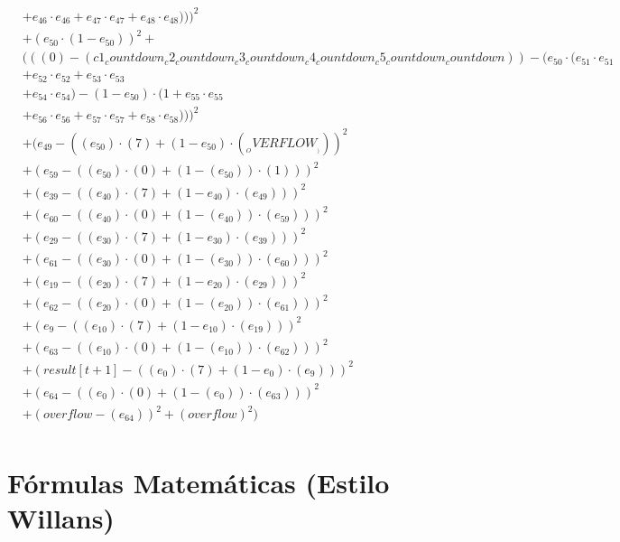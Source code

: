 \documentclass[10pt, a4paper]{article}
\begin{document}
\begin{small}
\begin{align*}
& + e_{46} \cdot e_{46} + e_{47} \cdot e_{47} + e_{48} \cdot e_{48})))^{2} \\
& + (e_{50} \cdot (1 - e_{50}))^{2} + \\
& (((0) - (c1_countdown_c2_countdown_c3_countdown_c4_countdown_c5_countdown_countdown)) - (e_{50} \cdot (e_{51} \cdot e_{51} \\
& + e_{52} \cdot e_{52} + e_{53} \cdot e_{53} \\
& + e_{54} \cdot e_{54}) - (1 - e_{50}) \cdot (1 + e_{55} \cdot e_{55} \\
& + e_{56} \cdot e_{56} + e_{57} \cdot e_{57} + e_{58} \cdot e_{58})))^{2} \\
& + (e_{49} - ((e_{50})  \cdot  (7) + (1 - e_{50})  \cdot  (__OVERFLOW__)))^{2} \\
& + (e_{59} - ((e_{50}) \cdot (0) + (1 - (e_{50})) \cdot (1)))^{2} \\
& + (e_{39} - ((e_{40})  \cdot  (7) + (1 - e_{40})  \cdot  (e_{49})))^{2} \\
& + (e_{60} - ((e_{40}) \cdot (0) + (1 - (e_{40})) \cdot (e_{59})))^{2} \\
& + (e_{29} - ((e_{30})  \cdot  (7) + (1 - e_{30})  \cdot  (e_{39})))^{2} \\
& + (e_{61} - ((e_{30}) \cdot (0) + (1 - (e_{30})) \cdot (e_{60})))^{2} \\
& + (e_{19} - ((e_{20})  \cdot  (7) + (1 - e_{20})  \cdot  (e_{29})))^{2} \\
& + (e_{62} - ((e_{20}) \cdot (0) + (1 - (e_{20})) \cdot (e_{61})))^{2} \\
& + (e_{9} - ((e_{10})  \cdot  (7) + (1 - e_{10})  \cdot  (e_{19})))^{2} \\
& + (e_{63} - ((e_{10}) \cdot (0) + (1 - (e_{10})) \cdot (e_{62})))^{2} \\
& + (result[t+1] - ((e_{0})  \cdot  (7) + (1 - e_{0})  \cdot  (e_{9})))^{2} \\
& + (e_{64} - ((e_{0}) \cdot (0) + (1 - (e_{0})) \cdot (e_{63})))^{2} \\
& + (overflow - (e_{64}))^{2} + (overflow)^{2}) \\
\end{align*}
\end{small}\part{Fórmulas Matemáticas (Estilo Willans)}
\end{document}

